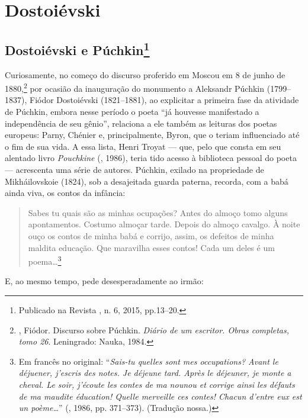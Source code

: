 \part{Dostoiévski}

\chapter{Dostoiévski e Púchkin\footnote{Publicado na Revista \protect{}, n. 6, 2015, pp.13--20.}}
\label{dostopuchkin}

Curiosamente, no começo do discurso proferido em Moscou em 8 de junho de
1880,\footnote{, Fiódor. Discurso sobre Púchkin. \emph{Diário de um escritor. Obras completas, tomo 26}. Leningrado: Nauka, 1984.} por ocasião da inauguração do monumento a Aleksandr Púchkin
(1799--1837), Fiódor Dostoiévski (1821--1881), ao explicitar a primeira fase da atividade de Púchkin, embora nesse período o poeta ``já houvesse manifestado a independência de seu gênio'', relaciona a
ele também as
leituras dos poetas europeus: Parny, Chénier e, principalmente, Byron,
que o teriam influenciado até o fim de sua vida. A essa lista, Henri
Troyat --- que, pelo que consta em seu alentado livro \emph{Pouchkine} (, 1986),
teria tido acesso à biblioteca pessoal do poeta --- acrescenta uma série
de autores. Púchkin, exilado na propriedade de Mikháilovskoie (1824), sob a
desajeitada guarda paterna, recorda, com a babá
ainda viva, os contos da infância:

\begin{quotation}
Sabes tu quais são as minhas ocupações? Antes do almoço tomo alguns apontamentos. Costumo almoçar tarde. Depois do almoço cavalgo. À noite ouço os contos de minha babá e corrijo, assim, os defeitos de minha maldita educação. Que maravilha esses contos! Cada um deles é um poema\ldots{}\footnote{Em francês no original: ``\emph{Sais-tu quelles sont mes occupations? Avant le déjuener, j'escris des notes. Je déjeune tard. Après le déjeuner, je monte a cheval. Le soir, j'écoute les contes de ma nounou et corrige ainsi les défauts de ma maudite éducation! Quelle merveille ces contes! Chacun d'entre eux est un poème\ldots{}}'' (, 1986, pp. 371--373). (Tradução nossa.)}
\end{quotation}


E, ao mesmo tempo, pede desesperadamente ao irmão:

